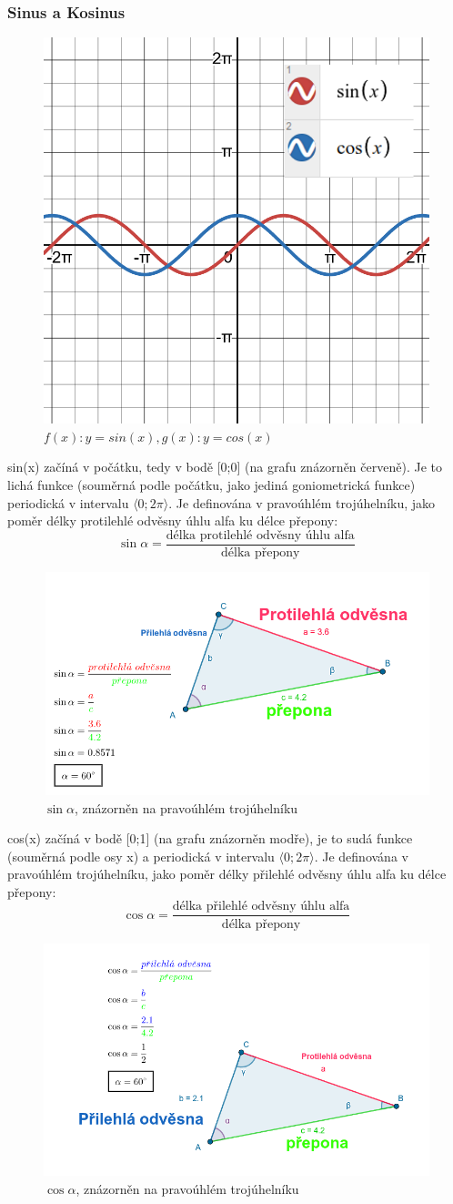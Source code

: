 \subsubsection{Sinus a Kosinus}
\begin{figure}[H]
        \centering
        \includegraphics[width=0.5\linewidth]{img/7_SinXCosX.png}
        \caption{$f(x): y=sin(x), g(x): y=cos(x)$} 
        \label{fig:Graf rovnice sin(x) a cos(x)}
\end{figure}

sin(x) začíná v počátku, tedy v bodě [0;0] (na grafu znázorněn červeně). Je to lichá funkce (souměrná podle počátku, jako jediná goniometrická funkce)  periodická v intervalu $\langle0; 2\pi\rangle$. Je definována v pravoúhlém trojúhelníku, jako poměr délky protilehlé odvěsny úhlu alfa ku délce přepony:
$$
    \sin\alpha=\frac{\text{délka protilehlé odvěsny úhlu alfa}}{\text{délka přepony}}
$$
\begin{figure}[h]
    \centering
    \includegraphics[width=0.5\linewidth]{img/7_TrojuhlenikASinus.png}
    \caption{$\sin \alpha$, znázorněn na pravoúhlém trojúhelníku}
    \label{fig:sinus-na-pravouhlem-trojuhelniku}
\end{figure}
cos(x) začíná v bodě [0;1] (na grafu znázorněn modře), je  to sudá funkce (souměrná podle osy x) a periodická v intervalu $\langle0; 2\pi\rangle$. Je definována v pravoúhlém trojúhelníku, jako poměr délky přilehlé odvěsny úhlu alfa ku délce přepony:
$$
    \cos\alpha=\frac{\text{délka přilehlé odvěsny úhlu alfa}}{\text{délka přepony}}
$$
\begin{figure}[h]
    \centering
    \includegraphics[width=0.5\linewidth]{img/7_TrojuhlenikAKosinus.png}
    \caption{$\cos \alpha$, znázorněn na pravoúhlém trojúhelníku}
    \label{fig:kosinus-na-pravouhlem-trojuhelniku}
\end{figure}
